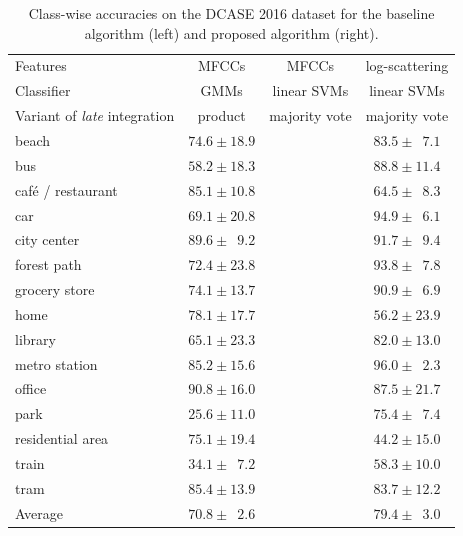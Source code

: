 \documentclass[journal]{IEEEtran}
\begin{document}
\begin{table}
\begin{center}
\caption{Class-wise accuracies on the DCASE 2016 dataset for the baseline algorithm (left) and proposed algorithm (right).}
\begin{tabular}{lccc}
Features & MFCCs & MFCCs & log-scattering \\
Classifier  & GMMs & linear SVMs & linear SVMs \\
Variant of \emph{late} integration & product & majority vote & majority vote \\
\midrule
beach & $74.6 \pm 18.9$ & & $83.5 \pm \phantom{0}7.1$ \\
bus & $58.2 \pm 18.3$ & & $88.8 \pm 11.4$ \\
caf\'{e} / restaurant & $85.1 \pm 10.8$ & & $64.5 \pm \phantom{0}8.3$ \\
car & $69.1 \pm 20.8$ & & $94.9 \pm \phantom{0}6.1$ \\
city center & $89.6 \pm \phantom{0}9.2$ & & $91.7 \pm \phantom{0}9.4$ \\
forest path & $72.4 \pm 23.8$ & & $93.8 \pm \phantom{0}7.8$ \\
grocery store & $74.1 \pm 13.7$ & & $90.9 \pm \phantom{0}6.9$ \\
home & $78.1 \pm 17.7$ & & $56.2 \pm 23.9$ \\
library & $65.1 \pm 23.3$ & & $82.0 \pm 13.0$ \\
metro station & $85.2 \pm 15.6$ & & $96.0 \pm \phantom{0}2.3$ \\
office & $90.8 \pm 16.0$ & & $87.5 \pm 21.7$ \\
park & $25.6 \pm 11.0$ & & $75.4 \pm \phantom{0}7.4$ \\
residential area & $75.1 \pm 19.4$ & & $44.2 \pm 15.0$ \\
train & $34.1 \pm \phantom{0}7.2$ & & $58.3 \pm 10.0$ \\
tram & $85.4 \pm 13.9$ & & $83.7 \pm 12.2$ \\
\bottomrule
Average & $70.8 \pm \phantom{0}2.6$ & & $79.4 \pm \phantom{0}3.0$
\end{tabular}
\end{center}
\label{table:dcase2016}
\end{table}
\end{document}
